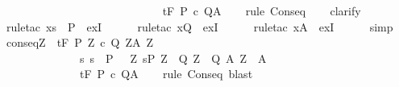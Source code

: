 \begin{isabellebody}
\ \ \ \ \ \ \ \ \ \ \ \ \ \ {\isasymLongrightarrow}\isanewline
\ \ \ \ \ \ \ \ \ \ \ \ \ \ {\isasymGamma}{\isacharcomma}{\isasymTheta}{\isasymturnstile}\isactrlsub t\isactrlbsub {\isacharslash}F\isactrlesub \ P\ c\ Q{\isacharcomma}A{\isachardoublequoteclose}\isanewline
%
\isadelimproof
\ \ %
\endisadelimproof
%
\isatagproof
{}\isamarkupfalse%
\ {\isacharparenleft}rule\ Conseq{\isacharparenright}\isanewline
\ \ \isamarkupfalse%
\ clarify\isanewline
\ \ \isamarkupfalse%
\ {\isacharparenleft}rule{\isacharunderscore}tac\ x{\isacharequal}{\isachardoublequoteopen}{\isacharbraceleft}s{\isacharbraceright}\ {\isasyminter}\ P{\isachardoublequoteclose}\ \ exI{\isacharparenright}\ \ \isanewline
\ \ \isamarkupfalse%
\ {\isacharparenleft}rule{\isacharunderscore}tac\ x{\isacharequal}{\isachardoublequoteopen}Q{\isachardoublequoteclose}\ \ exI{\isacharparenright}\ \ \isanewline
\ \ \isamarkupfalse%
\ {\isacharparenleft}rule{\isacharunderscore}tac\ x{\isacharequal}{\isachardoublequoteopen}A{\isachardoublequoteclose}\ \ exI{\isacharparenright}\ \ \isanewline
\ \ \isamarkupfalse%
\ simp%
\endisatagproof
{\isafoldproof}%
%
\isadelimproof
\isanewline
%
\endisadelimproof
\isanewline
\isanewline
{}\isamarkupfalse%
\ conseq{\isacharcolon}{\isachardoublequoteopen}{\isasymlbrakk}{\isasymforall}Z{\isachardot}\ {\isasymGamma}{\isacharcomma}{\isasymTheta}\ {\isasymturnstile}\isactrlsub t\isactrlbsub {\isacharslash}F\isactrlesub \ {\isacharparenleft}P{\isacharprime}\ Z{\isacharparenright}\ c\ {\isacharparenleft}Q{\isacharprime}\ Z{\isacharparenright}{\isacharcomma}{\isacharparenleft}A{\isacharprime}\ Z{\isacharparenright}{\isacharsemicolon}\isanewline
\ \ \ \ \ \ \ \ \ \ \ \ \ \ {\isasymforall}s{\isachardot}\ s\ {\isasymin}\ P\ {\isasymlongrightarrow}\ {\isacharparenleft}{\isasymexists}\ Z{\isachardot}\ s{\isasymin}P{\isacharprime}\ Z\ {\isasymand}\ {\isacharparenleft}Q{\isacharprime}\ Z\ {\isasymsubseteq}\ Q{\isacharparenright}{\isasymand}\ {\isacharparenleft}A{\isacharprime}\ Z\ {\isasymsubseteq}\ A{\isacharparenright}{\isacharparenright}{\isasymrbrakk}\isanewline
\ \ \ \ \ \ \ \ \ \ \ \ \ \ {\isasymLongrightarrow}\isanewline
\ \ \ \ \ \ \ \ \ \ \ \ \ \ {\isasymGamma}{\isacharcomma}{\isasymTheta}{\isasymturnstile}\isactrlsub t\isactrlbsub {\isacharslash}F\isactrlesub \ P\ c\ Q{\isacharcomma}A{\isachardoublequoteclose}\isanewline
%
\isadelimproof
\ \ %
\endisadelimproof
%
\isatagproof
{}\isamarkupfalse%
\ {\isacharparenleft}rule\ Conseq{\isacharprime}{\isacharparenright}\ blast%

\end{isabellebody}
